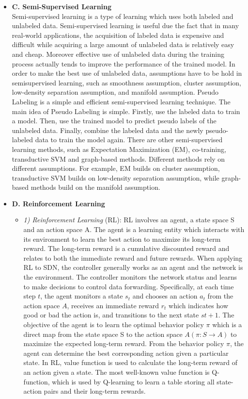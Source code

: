 \begin{itemize}
\begin{itemize}
\begin{itemize}
\end{itemize}
\end{itemize}
\item[] \textbf{C. Semi-Supervised Learning}\\
Semi-supervised learning is a type of learning which uses both labeled and unlabeled data. Semi-supervised learning is useful due the fact that in many real-world applications, the acquisition of labeled data is expensive and difficult while acquiring a large amount of unlabeled data is relatively easy and cheap. Moreover effective use of unlabeled data during the training process actually tends to improve the performance of the trained model. In order to make the best use of unlabeled data, assumptions have to be hold in semisupervised learning, such as smoothness assumption, cluster assumption, low-density separation assumption, and manifold assumption. Pseudo Labeling \cite{Wu2018} is a simple and efficient semi-supervised learning technique. The main idea of Pseudo Labeling is simple. Firstly, use the labeled data to train a model. Then, use the trained model to predict pseudo labels of the unlabeled data. Finally, combine the labeled data and the newly pseudo-labeled data to train the model again. There are other semi-supervised learning methods, such as Expectation Maximization (EM), co-training, transductive SVM and graph-based methods. Different methods rely on different assumptions. For example, EM builds on cluster assumption, transductive SVM builds on low-density separation assumption, while graph-based methods build on the manifold assumption.
\item[]\textbf{D. Reinforcement Learning}
\begin{itemize}
\item[]\textit{1)	Reinforcement Learning} (RL): RL \cite{Sutton2018, Kaelbling1996} involves an agent, a state space S and an action space A. The agent is a learning entity which interacts with its environment to learn the best action to maximize its long-term reward. The long-term reward is a cumulative discounted reward and relates to both the immediate reward and future rewards. When applying RL to SDN, the controller generally works as an agent and the network is the environment. The controller monitors the network status and learns to make decisions to control data forwarding. Specifically, at each time step $t$, the agent monitors a state $s_{t}$ and chooses an action $a_{t}$ from the action space $A$, receives an immediate reward $r_{t}$ which indicates how good or bad the action is, and transitions to the next state $st+1$. The objective of the agent is to learn the optimal behavior policy $\pi$ which is a direct map from the state space S to the action space $A (\pi : S \longrightarrow A)$ to maximize the expected long-term reward. From the behavior policy $\pi$, the agent can determine the best corresponding action given a particular state. In RL, value function is used to calculate the long-term reward of an action given a state. The most well-known value function is Q-function, which is used by Q-learning to learn a table storing all state-action pairs and their long-term rewards.

\end{itemize}
\end{itemize}

